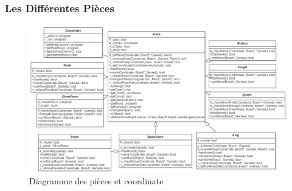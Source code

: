 \documentclass[10pt, a4paper]{article}
\begin{document}
\subsubsection{Les Différentes Pièces}
\begin{figure}[H]
\centering
\includegraphics[scale=0.5]{pieces_diagram.png}
\caption{Diagramme des pièces et coordinate}
\label{CD} %
\end{figure}
\end{document}
